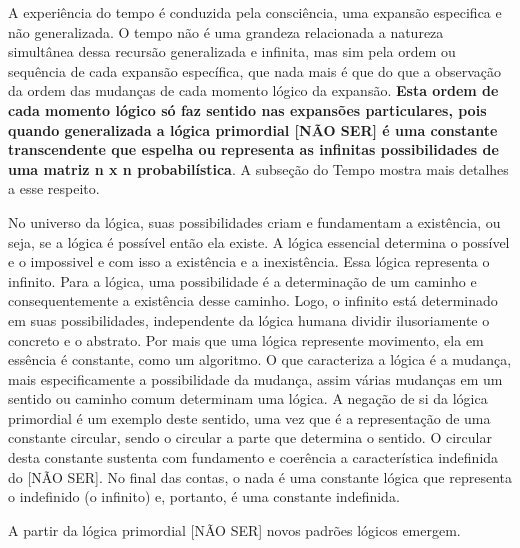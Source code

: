 A experiência do tempo é conduzida pela consciência, uma expansão especifica e não generalizada. O tempo não é uma grandeza relacionada a natureza simultânea dessa recursão generalizada e infinita, mas sim pela ordem ou sequência de cada expansão específica, que nada mais é que do que a observação da ordem das mudanças de cada momento lógico da expansão. \textbf{Esta ordem de cada momento lógico só faz sentido nas expansões particulares, pois quando generalizada a lógica primordial [NÃO SER] é uma constante transcendente que espelha ou representa as infinitas possibilidades de uma matriz n x n probabilística}. A subseção do Tempo mostra mais detalhes a esse respeito.

No universo da lógica, suas possibilidades criam e fundamentam a existência, ou seja, se a lógica é possível então ela existe. A lógica essencial determina o possível e o impossivel e com isso a existência e a inexistência. Essa lógica representa o infinito. Para a lógica, uma possibilidade é a determinação de um caminho e consequentemente a existência desse caminho. Logo, o infinito está determinado em suas possibilidades, independente da lógica humana dividir ilusoriamente o concreto e o abstrato. Por mais que uma lógica represente movimento, ela em essência é constante, como um algoritmo. O que caracteriza a lógica é a mudança, mais especificamente a possibilidade da mudança, assim várias mudanças em um sentido ou caminho comum determinam uma lógica. A negação de si da lógica primordial é um exemplo deste sentido, uma vez que é a representação de uma constante circular, sendo o circular a parte que determina o sentido. O circular desta constante sustenta com fundamento e coerência a característica indefinida do [NÃO SER]. No final das contas, o nada é uma constante lógica que representa o indefinido (o infinito) e, portanto, é uma constante indefinida.

A partir da lógica primordial [NÃO SER] novos padrões lógicos emergem. 








